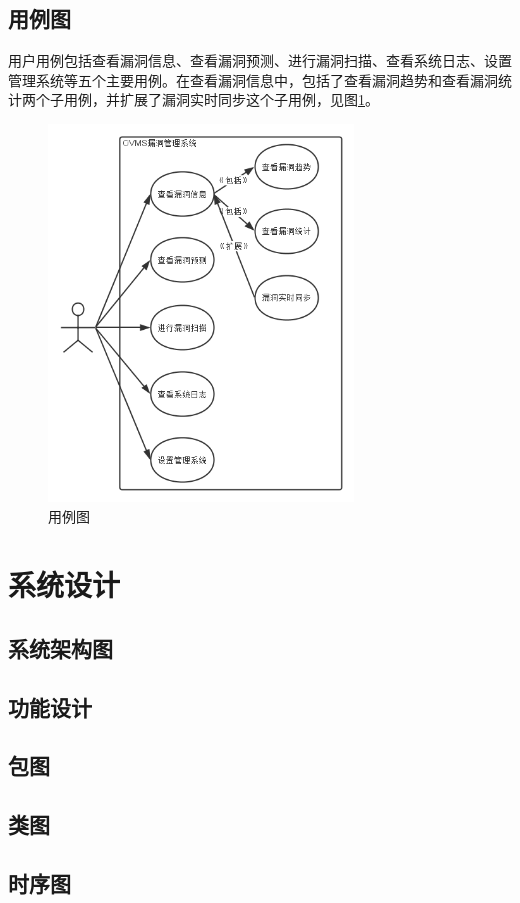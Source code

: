 \documentclass[a4paper]{ctexrep}
\begin{document}
			\subsection{用例图}
			用户用例包括查看漏洞信息、查看漏洞预测、进行漏洞扫描、查看系统日志、设置管理系统等五个主要用例。在查看漏洞信息中，包括了查看漏洞趋势和查看漏洞统计两个子用例，并扩展了漏洞实时同步这个子用例，见图\ref{fig:1}。
				\begin{figure}[htb]
					\centering
					\includegraphics[height=10cm]{fig/1_usecase.png}
					\caption{\label{fig:1} 用例图}
				\end{figure}

		\section{系统设计}
			\subsection{系统架构图}
			\subsection{功能设计}
			\subsection{包图}
			\subsection{类图}
			\subsection{时序图}
\end{document}

